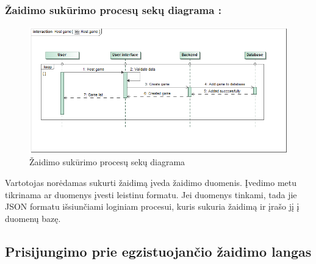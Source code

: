 \documentclass{VUMIFPSkursinis}
\begin{document}
		\subsubsection*{Žaidimo sukūrimo procesų sekų diagrama :}
			\begin{figure}[H]
				\centering
				\includegraphics[scale=0.5]{img/HostGame_sequence}
				\caption{Žaidimo sukūrimo procesų sekų diagrama}
				\label{img:Hostgame_sequence}
			\end{figure}
			Vartotojas norėdamas sukurti žaidimą įveda žaidimo duomenis. Įvedimo metu 
			tikrinama ar duomenys įvesti leistinu formatu. Jei duomenys tinkami, tada 
			jie JSON formatu išsiunčiami loginiam procesui, kuris sukuria žaidimą ir 
			įrašo jį į duomenų bazę.	
			
	\subsection{Prisijungimo prie egzistuojančio žaidimo langas}	
\end{document}
